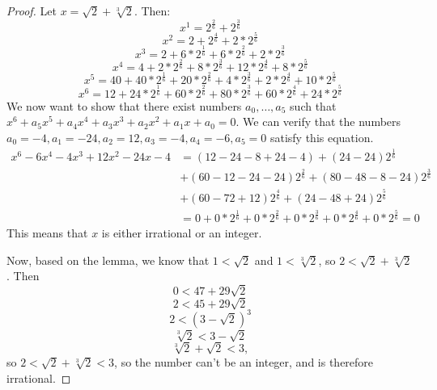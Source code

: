 \documentclass{article}
\begin{document}
\begin{enumerate}
	\begin{proof}
		Let $x = \sqrt{2} + \sqrt[3]{2}$. Then:
			\[x^1 = 2^{\frac{2}{6}} + 2^{\frac{3}{6}}\]
			\[x^2 = 2 + 2^{\frac{4}{6}} + 2*2^{\frac{5}{6}}\]
			\[x^3 = 2 + 6*2^{\frac{1}{6}} + 6*2^{\frac{2}{6}} + 2*2^{\frac{3}{6}}\]
			\[x^4 = 4 + 2*2^{\frac{2}{6}} + 8*2^{\frac{3}{6}} + 12*2^{\frac{4}{6}} + 8*2^{\frac{5}{6}}\]
			\[x^5 = 40 + 40*2^{\frac{1}{6}} + 20*2^{\frac{2}{6}} + 4*2^{\frac{3}{6}} + 2*2^{\frac{4}{6}} + 10*2^{\frac{5}{6}}\]
			\[x^6 = 12 + 24*2^{\frac{1}{6}} + 60*2^{\frac{2}{6}} + 80*2^{\frac{3}{6}} + 60*2^{\frac{4}{6}} + 24*2^{\frac{5}{6}}\]
		We now want to show that there exist numbers $a_0, \dots, a_5$ such that $x^6 + a_5x^5 + a_4x^4 + a_3x^3 + a_2x^2 + a_1x + a_0 = 0$. We can verify that the numbers $a_0=-4, a_1=-24, a_2=12, a_3=-4, a_4=-6, a_5=0$ satisfy this equation.
		\begin{align*}
			x^6 - 6x^4 -4x^3 + 12x^2 -24x - 4 &= (12-24-8+24-4) + (24-24)2^{\frac{1}{6}} \\&+ (60-12-24-24)2^{\frac{2}{6}} + (80-48-8-24)2^{\frac{3}{6}} \\&+ (60-72+12)2^{\frac{4}{6}} + (24-48+24)2^{\frac{5}{6}} \\&= 0 + 0*2^{\frac{1}{6}}+ 0*2^{\frac{2}{6}}+ 0*2^{\frac{3}{6}}+ 0*2^{\frac{4}{6}}+ 0*2^{\frac{5}{6}} = 0
		\end{align*}
		This means that $x$ is either irrational or an integer.
		
		Now, based on the lemma, we know that $1 < \sqrt{2}$ and $1 < \sqrt[3]{2}$, so $2 < \sqrt{2} + \sqrt[3]{2}$. Then
		\[0 < 47 + 29\sqrt{2}\]
		\[2 < 45 + 29\sqrt{2}\]
		\[2 < (3-\sqrt{2})^3\]
		\[\sqrt[3]{2} < 3 - \sqrt{2}\]
		\[\sqrt[3]{2} + \sqrt{2} < 3,\]
		so $2 < \sqrt{2} + \sqrt[3]{2} < 3$, so the number can't be an integer, and is therefore irrational.
	\end{proof}
\end{enumerate}
\end{document}
